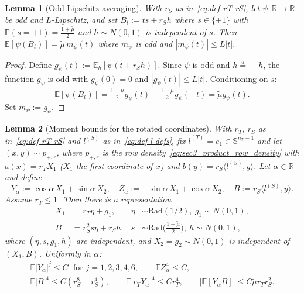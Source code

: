 \documentclass[10pt]{article}
\newtheorem{lemma}{Lemma}
\newcommand{\R}{\mathbb R}
\newcommand{\Pbb}{\mathbb P}
\newcommand{\Ebb}{\mathbb E}
\newcommand{\ip}[2]{\langle #1,#2\rangle}
\newcommand{\sphere}[1]{\mathbb S^{#1}}
\newcommand{\trg}{T}
\newcommand{\nT}{n_{\trg}}
\newcommand{\src}{S}
\begin{document}
\begin{lemma}[Odd Lipschitz averaging]
\label{lem:sec3_product_odd_lip}
With $r_S$ as in~\eqref{eq:def-rT-rS}, let $\psi:\R\to\R$ be odd and $L$-Lipschitz,
and set $B_t:=ts+r_S h$ where $s\in\{\pm1\}$ with
$\Pbb(s=+1)=\frac{1+\tilde\mu}{2}$ and $h\sim N(0,1)$ is independent of $s$.
Then $\Ebb[\psi(B_t)]=\tilde\mu\,m_\psi(t)$ where $m_\psi$ is odd and
$|m_\psi(t)|\le L|t|$.
\end{lemma}

\begin{proof}
Define $g_\psi(t):=\Ebb_h[\psi(t+r_S h)]$.  Since $\psi$ is odd and
$h\overset{d}{=}-h$, the function $g_\psi$ is odd with $g_\psi(0)=0$ and
$|g_\psi(t)|\le L|t|$.  Conditioning on $s$:
\[
    \Ebb[\psi(B_t)]
    =
    \tfrac{1+\tilde\mu}{2}g_\psi(t)+\tfrac{1-\tilde\mu}{2}g_\psi(-t)
    =
    \tilde\mu g_\psi(t).
\]
Set $m_\psi:=g_\psi$.
\end{proof}

\begin{lemma}[Moment bounds for the rotated coordinates]
\label{lem:sec3_product_moment_bds}
With $r_T$, $r_S$ as in~\eqref{eq:def-rT-rS} and $l^{(\src)}$ as in~\eqref{eq:def-l-defs}, fix
$l^{(\trg)}_+=e_1\in\sphere{\nT-1}$ and let $(x,y)\sim p_{+,r}$, where
$p_{+,r}$ is the row density~\eqref{eq:sec3_product_row_density} with
$a(x)=r_T X_1$ ($X_1$ the first coordinate of $x$) and
$b(y)=r_S\ip{l^{(\src)}}{y}$.
Let $\alpha\in\R$ and define
\[
    Y_\alpha:=\cos\alpha\,X_1+\sin\alpha\,X_2, \quad
    Z_\alpha:=-\sin\alpha\,X_1+\cos\alpha\,X_2, \quad
    B:=r_S\ip{l^{(\src)}}{y}.
\]
Assume $r_T\le1$.  Then there is a representation
\begin{align}
    X_1 &= r_T\eta+g_1, & \eta&\sim\mathrm{Rad}(1/2),\ g_1\sim N(0,1),
    \label{eq:sec3_product_X1_decomp}\\
    B   &= r_S^2 s\eta+r_S h, & s&\sim\mathrm{Rad}\!\bigl(\tfrac{1+\tilde\mu}{2}\bigr),\
    h\sim N(0,1), \label{eq:sec3_product_B_decomp}
\end{align}
where $(\eta,s,g_1,h)$ are independent, and $X_2=g_2\sim N(0,1)$ is
independent of $(X_1,B)$.  Uniformly in $\alpha$:
\begin{gather*}
    \Ebb|Y_\alpha|^j\le C\;\text{ for }j=1,2,3,4,6, \qquad
    \Ebb Z_\alpha^4\le C,\\
    \Ebb|B|^4\le C(r_S^8+r_S^4), \qquad
    \Ebb|r_T Y_\alpha|^4\le Cr_T^4, \qquad
    |\Ebb[Y_\alpha B]|\le C\tilde\mu r_T r_S^2.
\end{gather*}
\end{lemma}
\end{document}

